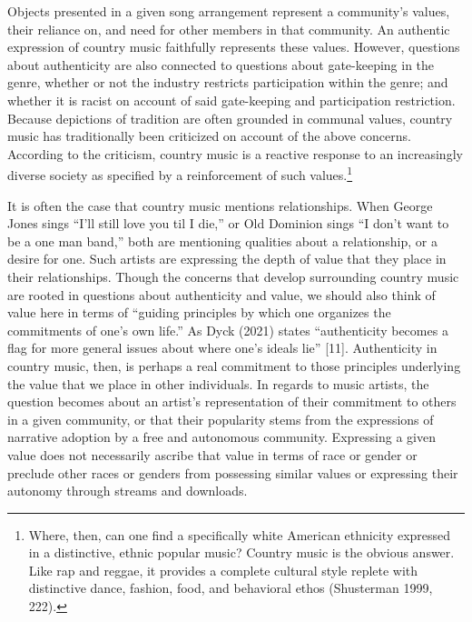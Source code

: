 \documentclass[12pt]{book}
\theoremstyle{definition}
\theoremstyle{remark}
\begin{document}
Objects presented in a given song arrangement represent a community's values, their reliance on, and need for other members in that community. An authentic expression of country music faithfully represents these values. However, questions about authenticity are also connected to questions about gate-keeping in the genre, whether or not the industry restricts participation within the genre; and whether it is racist on account of said gate-keeping and participation restriction. Because depictions of tradition are often grounded in communal values, country music has traditionally been criticized on account of the above concerns. According to the criticism, country music is a reactive response to an increasingly diverse society as specified by a reinforcement of such values.\footnote{Where, then, can one find a specifically white American ethnicity expressed in a distinctive, ethnic popular music? Country music is the obvious answer. Like rap and reggae, it provides a complete cultural style replete with distinctive dance, fashion, food, and behavioral ethos (Shusterman 1999, 222).}

It is often the case that country music mentions relationships. When George Jones sings ``I'll still love you til I die,'' or Old Dominion sings ``I don't want to be a one man band,'' both are mentioning qualities about a relationship, or a desire for one. Such artists are expressing the depth of value that they place in their relationships. Though the concerns that develop surrounding country music are rooted in questions about authenticity and value, we should also think of value here in terms of ``guiding principles by which one organizes the commitments of one's own life.'' As Dyck (2021) states ``authenticity becomes a flag for more general issues about where one's ideals lie'' {[}11{]}. Authenticity in country music, then, is perhaps a real commitment to those principles underlying the value that we place in other individuals. In regards to music artists, the question becomes about an artist's representation of their commitment to others in a given community, or that their popularity stems from the expressions of narrative adoption by a free and autonomous community. Expressing a given value does not necessarily ascribe that value in terms of race or gender or preclude other races or genders from possessing similar values or expressing their autonomy through streams and downloads.
\end{document}
